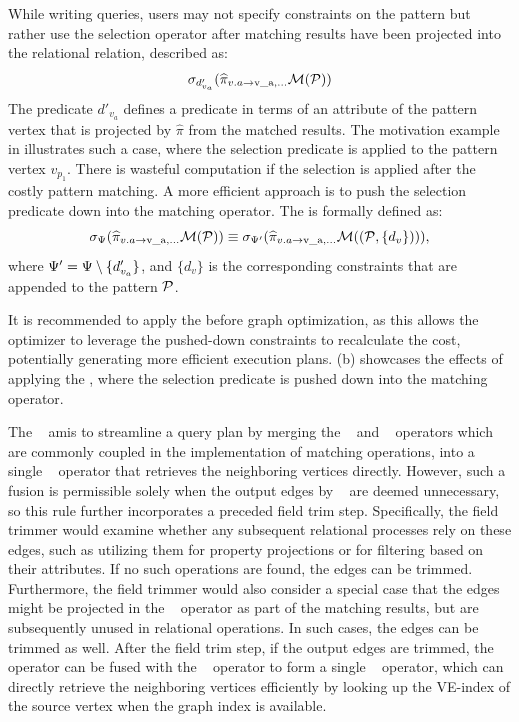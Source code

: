 While writing queries, users may not specify constraints on the pattern but rather use the selection operator after matching results have been projected into the relational relation, described as:
\[
\sigma_{d'_{v_a}} (\widehat{\pi}_{v.a \rightarrow \text{v\_a}, \ldots} \mathcal{M}(\mathcal{P}))
\]
The predicate $d'_{v_a}$ defines a predicate in terms of an attribute of the pattern vertex that is projected by $\widehat{\pi}$ from the matched results. The motivation example in  illustrates such a case, where the selection predicate  is applied to the pattern vertex $v_{p_1}$.
There is wasteful computation if the selection is applied after the costly pattern matching. A more efficient approach is to push the selection predicate down into the matching operator.
The \filterrule is formally defined as:
\begin{equation*}
\sigma_{\Psi} (\widehat{\pi}_{v.a \rightarrow \text{v\_a}, \ldots} \mathcal{M}(\mathcal{P})) \\
\equiv \sigma_{\Psi'} (\widehat{\pi}_{v.a \rightarrow \text{v\_a}, \ldots} \mathcal{M}((\mathcal{P}, \{d_v\}))),
\end{equation*}
where $\Psi' = \Psi \setminus \{d'_{v_a}\}$, and $\{d_v\}$ is the corresponding constraints that are appended to the pattern $\mathcal{P}$.

It is recommended to apply the \filterrule before graph optimization, as this allows the optimizer to leverage the pushed-down constraints to recalculate the cost, potentially generating more efficient execution plans. (b) showcases the effects of applying the \filterrule, where the selection predicate  is pushed down into the matching operator.

The \joinfuserule~ amis to streamline a query plan by merging the \expandedge~ and \getvertex~ operators which are commonly coupled in the implementation of matching operations, into a single \expand~ operator that retrieves the neighboring vertices directly.
However, such a fusion is permissible solely when the output edges by \expandedge~ are deemed unnecessary, so this rule further incorporates a preceded field trim step.
Specifically, the field trimmer would examine whether any subsequent relational processes rely on these edges, such as utilizing them for property projections or for filtering based on their attributes.
If no such operations are found, the edges can be trimmed.
Furthermore, the field trimmer would also consider a special case that the edges might be projected in the \scangraphtable~ operator as part of the matching results, but are subsequently unused in relational operations. In such cases, the edges can be trimmed as well.
After the field trim step, if the output edges are trimmed, the \expandedge~ operator can be fused with the \getvertex~ operator to form a single \expand~ operator, which can directly retrieve the neighboring vertices efficiently by looking up the VE-index of the source vertex when the graph index is available.


